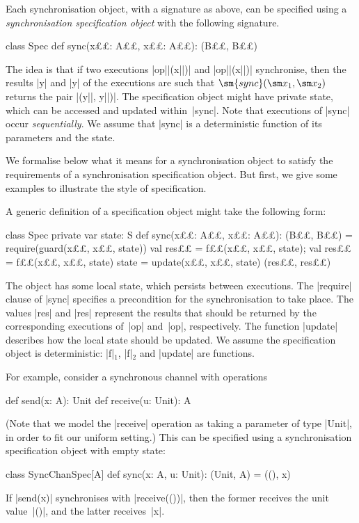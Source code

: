 Each synchronisation object, with a signature as above, can be specified using
a \emph{synchronisation specification object} with the following signature.
%
\begin{scala}
class Spec{
  def sync(x££: A££, x££: A££): (B££, B££)
}
\end{scala}
%
The idea is that if two executions |op||(x||)| and |op||(x||)|
synchronise, then the results |y| and |y| of the executions are such
that $\sm{sync}(\sm x_1, \sm x_2)$ returns the pair |(y||, y||)|.
The specification object might have private state, which can be accessed and
updated within~|sync|.  Note that executions of |sync| occur
\emph{sequentially}.  We assume that |sync| is a deterministic function of its
parameters and the state.

We formalise below what it means for a synchronisation object to satisfy the
requirements of a synchronisation specification object.  But first, we give
some examples to illustrate the style of specification. 

A generic definition of a specification object might take the following form: 
%
\begin{scala}
class Spec{
  private var state: S
  def sync(x££: A££, x££: A££): (B££, B££) = {
    require(guard(x££, x££, state))
    val res££ = f££(x££, x££, state); val res££ = f££(x££, x££, state)
    state = update(x££, x££, state)
    (res££, res££)
  }
}
\end{scala}
%
The object has some local state, which persists between executions.  The
|require| clause of |sync| specifies a precondition for the synchronisation to
take place.  The values |res| and |res| represent the results that
should be returned by the corresponding executions of~|op| and~|op|,
respectively.  The function |update| describes how the local state should be
updated.  We assume the specification object is deterministic: |f|$_1$, |f|$_2$
and |update| are functions. 

For example, consider a synchronous channel with operations
\begin{scala}
def send(x: A): Unit
def receive(u: Unit): A
\end{scala}
%
(Note that we model the |receive| operation as taking a parameter of type
|Unit|, in order to fit our uniform setting.) 
%
This can be specified using a synchronisation specification object
with empty state:
%
\begin{scala}
class SyncChanSpec[A]{
  def sync(x: A, u: Unit): (Unit, A) = ((), x)
}
\end{scala}
%
If |send(x)| synchronises with |receive(())|, then the former receives the
unit value~|()|, and the latter receives~|x|. 

